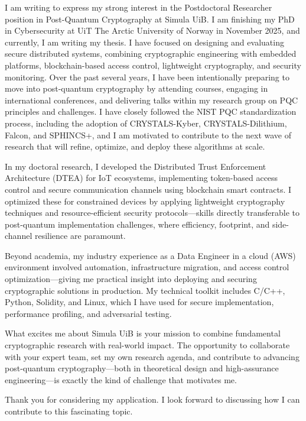 I am writing to express my strong interest in the Postdoctoral Researcher position in Post-Quantum Cryptography at Simula UiB. I am finishing my PhD in Cybersecurity at UiT The Arctic University of Norway in November 2025, and currently, I am writing my thesis. I have focused on designing and evaluating secure distributed systems, combining cryptographic engineering with embedded platforms, blockchain-based access control, lightweight cryptography, and security monitoring. Over the past several years, I have been intentionally preparing to move into post-quantum cryptography by attending courses, engaging in international conferences, and delivering talks within my research group on PQC principles and challenges. I have closely followed the NIST PQC standardization process, including the adoption of CRYSTALS-Kyber, CRYSTALS-Dilithium, Falcon, and SPHINCS+, and I am motivated to contribute to the next wave of research that will refine, optimize, and deploy these algorithms at scale.

In my doctoral research, I developed the Distributed Trust Enforcement Architecture (DTEA) for IoT ecosystems, implementing token-based access control and secure communication channels using blockchain smart contracts. I optimized these for constrained devices by applying lightweight cryptography techniques and resource-efficient security protocols—skills directly transferable to post-quantum implementation challenges, where efficiency, footprint, and side-channel resilience are paramount.

Beyond academia, my industry experience as a Data Engineer in a cloud (AWS) environment involved automation, infrastructure migration, and access control optimization—giving me practical insight into deploying and securing cryptographic solutions in production. My technical toolkit includes C/C++, Python, Solidity, and Linux, which I have used for secure implementation, performance profiling, and adversarial testing.

What excites me about Simula UiB is your mission to combine fundamental cryptographic research with real-world impact. The opportunity to collaborate with your expert team, set my own research agenda, and contribute to advancing post-quantum cryptography—both in theoretical design and high-assurance engineering—is exactly the kind of challenge that motivates me.

Thank you for considering my application. I look forward to discussing how I can contribute to this fascinating topic.